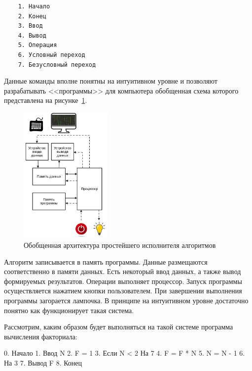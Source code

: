 \begin{verbatim}
    1. Начало
    2. Конец
    3. Ввод
    4. Вывод
    5. Операция
    6. Условный переход
    7. Безусловный переход
\end{verbatim}
Данные команды вполне понятны на интуитивном уровне и позволяют разрабатывать <<программы>> для компьютера обобщенная схема которого представлена на рисунке~\ref{type-01}.
\begin{figure}[htbp]
    \centering
    \includegraphics[width=0.4\textwidth]{img/type-01.png}
    \caption{Обобщенная архитектура простейшего исполнителя алгоритмов}
    \label{type-01}
\end{figure}
Алгоритм записывается в память программы. Данные размещаются соответственно в памяти данных. Есть некоторый ввод данных, а также вывод формируемых результатов. Операции выполняет процессор. Запуск программы осуществляется нажатием кнопки пользователем. При завершении выполнения программы загорается лампочка. В принципе на интуитивном уровне достаточно понятно как функционирует такая система.

Рассмотрим, каким образом будет выполняться на такой системе программа вычисления факториала:

\begin{ffcode}
0. Начало
1. Ввод N
2. F = 1
3. Если N < 2 На 7
4. F = F * N
5. N = N - 1
6. На 3
7. Вывод F
8. Конец
\end{ffcode}

